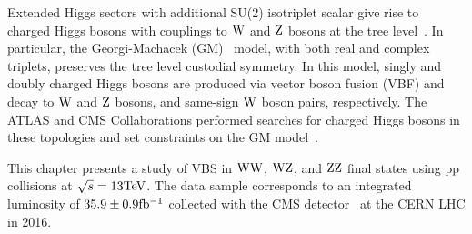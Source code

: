 Extended Higgs sectors with additional SU(2) isotriplet scalar give rise to charged Higgs bosons with couplings to $\mathrm{W}$ and $\mathrm{Z}$ bosons at the tree level~\cite{Englert2013a}. In particular, the Georgi-Machacek (GM)~\cite{GEORGI1985463} model, with both real and complex triplets,  preserves the tree level custodial symmetry. In this model, singly and doubly charged Higgs bosons are produced via vector boson fusion (VBF) and decay to $\mathrm{W}$ and $\mathrm{Z}$ bosons, and same-sign $\mathrm{W}$ boson pairs, respectively. The ATLAS and CMS Collaborations performed searches for charged Higgs bosons in these topologies and set constraints on the GM model~\cite{Sirunyan:2017ret,Sirunyan:2017sbn,PhysRevLett.114.231801}.

This chapter presents a study of VBS in $\mathrm{W}\mathrm{W}$, $\mathrm{W}\mathrm{Z}$, and $\mathrm{Z}\mathrm{Z}$ final states using pp collisions at $\sqrt{s}=13\mathrm{TeV}$. The data sample corresponds to an integrated luminosity of $35.9 \pm 0.9\mathrm{fb^{-1}}$ collected with the CMS detector~\cite{Chatrchyan:2008zzk} at the CERN LHC in 2016. 






